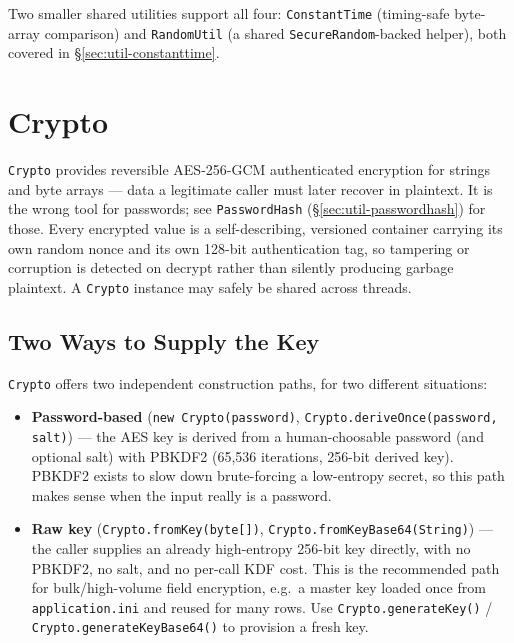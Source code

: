 \noindent
Two smaller shared utilities support all four: \texttt{ConstantTime} (timing-safe byte-array comparison) and \texttt{RandomUtil} (a shared \texttt{SecureRandom}-backed helper), both covered in \S\ref{sec:util-constanttime}.

\section{Crypto}
\label{sec:util-crypto}

\texttt{Crypto} provides reversible AES-256-GCM authenticated encryption for strings and byte arrays --- data a legitimate caller must later recover in plaintext.  It is the wrong tool for passwords; see \texttt{PasswordHash} (\S\ref{sec:util-passwordhash}) for those.  Every encrypted value is a self-describing, versioned container carrying its own random nonce and its own 128-bit authentication tag, so tampering or corruption is detected on decrypt rather than silently producing garbage plaintext.  A \texttt{Crypto} instance may safely be shared across threads.

\subsection{Two Ways to Supply the Key}

\texttt{Crypto} offers two independent construction paths, for two different situations:

\begin{itemize}
  \item \textbf{Password-based} (\texttt{new Crypto(password)}, \texttt{Crypto.deriveOnce(password, salt)}) --- the AES key is derived from a human-choosable password (and optional salt) with PBKDF2 (65,536 iterations, 256-bit derived key).  PBKDF2 exists to slow down brute-forcing a low-entropy secret, so this path makes sense when the input really is a password.
  \item \textbf{Raw key} (\texttt{Crypto.fromKey(byte[])}, \texttt{Crypto.fromKeyBase64(String)}) --- the caller supplies an already high-entropy 256-bit key directly, with no PBKDF2, no salt, and no per-call KDF cost.  This is the recommended path for bulk/high-volume field encryption, e.g.\ a master key loaded once from \texttt{application.ini} and reused for many rows.  Use \texttt{Crypto.generateKey()} / \texttt{Crypto.generateKeyBase64()} to provision a fresh key.
\end{itemize}

